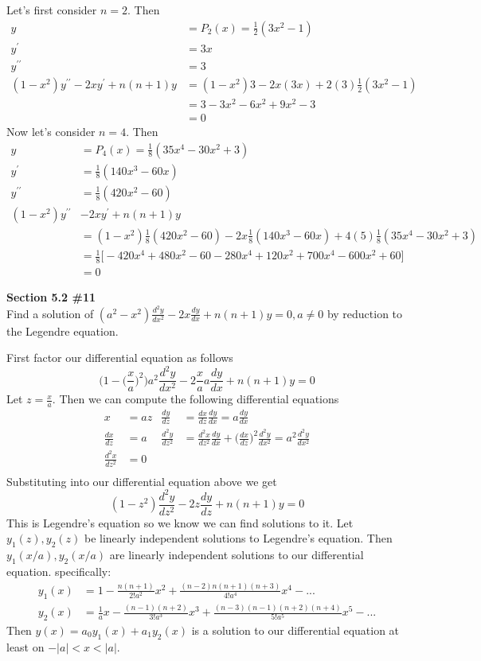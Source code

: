 \documentclass[12pt]{article}
\newcommand{\problem}[1]{\hspace{-4 ex} \large \textbf{#1}\\}
\begin{document}
	Let's first consider $n=2$. Then 
	\begin{align*}
		y & = P_2(x) = \frac{1}{2}(3x^2-1) \\
		y^\prime & = 3x \\
		y^{\prime\prime} & = 3 \\
		(1-x^2)y^{\prime\prime} - 2xy^\prime + n(n+1)y & = (1-x^2)3 - 2x(3x) + 2(3)\frac{1}{2}(3x^2-1) \\
		& = 3-3x^2 - 6x^2 + 9x^2-3 \\
		& = 0
	\end{align*}
	Now let's consider $n=4$. Then 
	\begin{align*}
	y & = P_4(x) = \frac{1}{8}(35x^4-30x^2+3) \\
	y^\prime & = \frac{1}{8}(140x^3-60x) \\
	y^{\prime\prime} & = \frac{1}{8}(420x^2-60) \\
	(1-x^2)y^{\prime\prime} &- 2xy^\prime + n(n+1)y \\ 
	& = (1-x^2)\frac{1}{8}(420x^2-60) - 2x\frac{1}{8}(140x^3-60x) + 4(5)\frac{1}{8}(35x^4-30x^2+3) \\
	& = \frac{1}{8} \big[  -420x^4 + 480x^2 - 60 - 280x^4 + 120x^2 +700x^4 - 600x^2 + 60 \big] \\
	& = 0
	\end{align*}
	
\problem{Section 5.2 \#11} Find a solution of $(a^2-x^2)\frac{d^2y}{dx^2} - 2x\frac{dy}{dx} +n(n+1)y = 0, a \neq 0$ by reduction to the Legendre equation.

	First factor our differential equation as follows $$\Big(1-\Big(\frac{x}{a}\Big)^2\Big)a^2\frac{d^2y}{dx^2} - 2\frac{x}{a}a\frac{dy}{dx} +n(n+1)y = 0$$
	Let $z = \frac{x}{a}$. Then we can compute the following differential equations
	\begin{align*}
		x & = az & \frac{dy}{dz} & = \frac{dx}{dz}\frac{dy}{dx}  = a\frac{dy}{dx} \\
		\frac{dx}{dz} & = a & \frac{d^2y}{dz^2} & = \frac{d^2x}{dz^2}\frac{dy}{dx} + \Big(\frac{dx}{dz}\Big)^2 \frac{d^2y}{dx^2} = a^2 \frac{d^2y}{dx^2}\\
		\frac{d^2x}{dz^2} & = 0 & & \\
	\end{align*}
	Substituting into our differential equation above we get $$(1-z^2)\frac{d^2y}{dz^2} - 2z\frac{dy}{dz} +n(n+1)y = 0$$ This is Legendre's equation so we know we can find solutions to it. Let $y_1(z), y_2(z)$ be linearly independent solutions to Legendre's equation. Then $y_1(x/a), y_2(x/a)$ are linearly independent solutions to our differential equation. specifically:
	\begin{align*}
		y_1(x) & = 1 - \frac{n(n+1)}{2!a^2}x^2 + \frac{(n-2)n(n+1)(n+3)}{4!a^4}x^4 - ... \\
		y_2(x) & = \frac{1}{a}x - \frac{(n-1)(n+2)}{3!a^3}x^3 + \frac{(n-3)(n-1)(n+2)(n+4)}{5!a^5}x^5 - ...
	\end{align*}
	Then $y(x) = a_0y_1(x) + a_1y_2(x)$ is a solution to our differential equation at least on $-\vert a \vert <x< \vert a \vert$.
	
\end{document}
